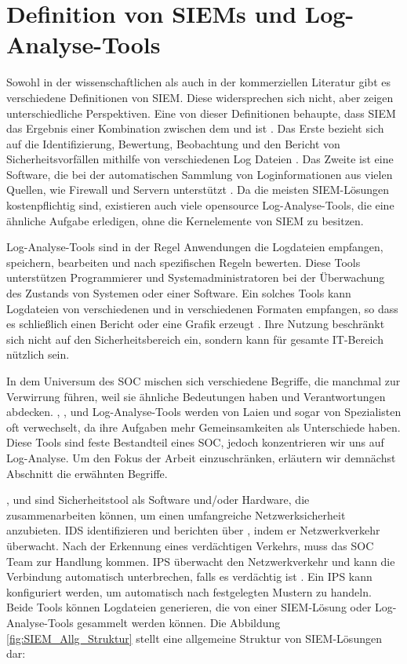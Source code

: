 \section{Definition von SIEMs und Log-Analyse-Tools}

Sowohl in der wissenschaftlichen als auch in der kommerziellen Literatur gibt es verschiedene Definitionen von \gls{SIEM}. Diese widersprechen sich nicht, aber zeigen unterschiedliche Perspektiven. Eine von dieser Definitionen behaupte, dass \gls{SIEM} das Ergebnis einer Kombination zwischen dem  und  ist \citep{Dorigo_SIEM}. Das Erste bezieht sich auf die Identifizierung, Bewertung, Beobachtung und den Bericht von Sicherheitsvorfällen mithilfe von verschiedenen Log Dateien \citep{techopedia_SEM}. Das Zweite ist eine Software, die bei der automatischen Sammlung von Loginformationen aus vielen Quellen, wie Firewall und Servern unterstützt \citep{techopedia_SIM}. Da die meisten \gls{SIEM}-Lösungen kostenpflichtig sind, existieren auch viele \gls{opensource} Log-Analyse-Tools, die eine ähnliche Aufgabe erledigen, ohne die Kernelemente von \gls{SIEM} zu besitzen.

Log-Analyse-Tools sind in der Regel Anwendungen die Logdateien empfangen, speichern, bearbeiten und nach spezifischen Regeln bewerten. Diese Tools unterstützen Programmierer und Systemadministratoren bei der Überwachung des Zustands von Systemen oder einer Software. Ein solches Tools kann Logdateien von verschiedenen  und in verschiedenen Formaten empfangen, so dass es schließlich einen Bericht oder eine Grafik erzeugt \citep{Korzeniowski_LATDef}. Ihre Nutzung beschränkt sich nicht auf den Sicherheitsbereich ein, sondern kann für gesamte IT-Bereich nützlich sein.

In dem Universum des \gls{SOC} mischen sich verschiedene Begriffe, die manchmal zur Verwirrung führen, weil sie ähnliche Bedeutungen haben und Verantwortungen abdecken. , ,  und Log-Analyse-Tools werden von Laien und sogar von Spezialisten oft verwechselt, da ihre Aufgaben mehr Gemeinsamkeiten als Unterschiede haben. Diese Tools sind feste Bestandteil eines \gls{SOC}, jedoch konzentrieren wir uns auf Log-Analyse. Um den Fokus der Arbeit einzuschränken, erläutern wir demnächst Abschnitt die erwähnten Begriffe.

,  und  sind Sicherheitstool als Software und/oder Hardware, die zusammenarbeiten können, um einen umfangreiche Netzwerksicherheit anzubieten. \gls{IDS} identifizieren und berichten über , indem er Netzwerkverkehr überwacht. Nach der Erkennung eines verdächtigen Verkehrs, muss das \gls{SOC} Team zur Handlung kommen. \gls{IPS} überwacht den Netzwerkverkehr und kann die Verbindung automatisch unterbrechen, falls es verdächtig ist \citep{Wendzel_IS}. Ein \gls{IPS} kann konfiguriert werden, um automatisch nach festgelegten Mustern zu handeln. Beide Tools können Logdateien generieren, die von einer \gls{SIEM}-Lösung oder Log-Analyse-Tools gesammelt werden können. Die Abbildung \ref{fig:SIEM_Allg_Struktur} stellt eine allgemeine Struktur von \gls{SIEM}-Lösungen dar:


